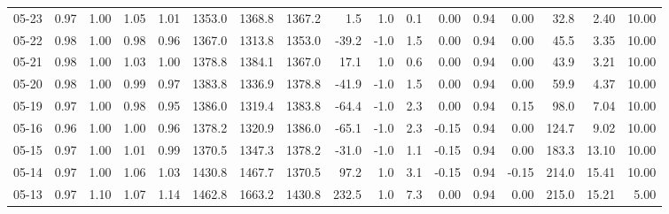 \begin{threeparttable}
{\begin{tabular}{lrrrrrrrrrrrrrrrr}
  05-23 &         0.97 &           1.00 &          1.05 &          1.01 & 1353.0 & 1368.8 & 1367.2 &        1.5 &                      1.0 &                 0.1 &       0.00 &      0.94 &           0.00 &             32.8 &            2.40 &                  10.00 \\
  05-22 &         0.98 &           1.00 &          0.98 &          0.96 & 1367.0 & 1313.8 & 1353.0 &      -39.2 &                     -1.0 &                 1.5 &       0.00 &      0.94 &           0.00 &             45.5 &            3.35 &                  10.00 \\
  05-21 &         0.98 &           1.00 &          1.03 &          1.00 & 1378.8 & 1384.1 & 1367.0 &       17.1 &                      1.0 &                 0.6 &       0.00 &      0.94 &           0.00 &             43.9 &            3.21 &                  10.00 \\
  05-20 &         0.98 &           1.00 &          0.99 &          0.97 & 1383.8 & 1336.9 & 1378.8 &      -41.9 &                     -1.0 &                 1.5 &       0.00 &      0.94 &           0.00 &             59.9 &            4.37 &                  10.00 \\
  05-19 &         0.97 &           1.00 &          0.98 &          0.95 & 1386.0 & 1319.4 & 1383.8 &      -64.4 &                     -1.0 &                 2.3 &       0.00 &      0.94 &           0.15 &             98.0 &            7.04 &                  10.00 \\
  05-16 &         0.96 &           1.00 &          1.00 &          0.96 & 1378.2 & 1320.9 & 1386.0 &      -65.1 &                     -1.0 &                 2.3 &      -0.15 &      0.94 &           0.00 &            124.7 &            9.02 &                  10.00 \\
  05-15 &         0.97 &           1.00 &          1.01 &          0.99 & 1370.5 & 1347.3 & 1378.2 &      -31.0 &                     -1.0 &                 1.1 &      -0.15 &      0.94 &           0.00 &            183.3 &           13.10 &                  10.00 \\
  05-14 &         0.97 &           1.00 &          1.06 &          1.03 & 1430.8 & 1467.7 & 1370.5 &       97.2 &                      1.0 &                 3.1 &      -0.15 &      0.94 &          -0.15 &            214.0 &           15.41 &                  10.00 \\
  05-13 &         0.97 &           1.10 &          1.07 &          1.14 & 1462.8 & 1663.2 & 1430.8 &      232.5 &                      1.0 &                 7.3 &       0.00 &      0.94 &           0.00 &            215.0 &           15.21 &                   5.00 \\

\end{tabular}}
\end{threeparttable}
